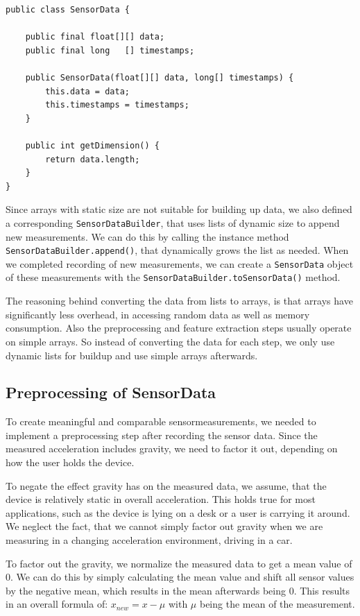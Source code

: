 \begin{lstlisting}[float,
caption={Class \lstinline$SensorData$ containing the raw sensor readings},
label={lst:sensordata}]
public class SensorData {
    
    public final float[][] data;
    public final long   [] timestamps;

    public SensorData(float[][] data, long[] timestamps) {
        this.data = data;
        this.timestamps = timestamps;
    }

    public int getDimension() {
        return data.length;
    }
}
\end{lstlisting}

Since arrays with static size are not suitable for building up data, we also defined a corresponding \lstinline$SensorDataBuilder$, that uses lists of dynamic size to append new measurements. We can do this by calling the instance method \lstinline$SensorDataBuilder.append()$, that dynamically grows the list as needed. When we completed recording of new measurements, we can create a \lstinline$SensorData$ object of these measurements with the \lstinline$SensorDataBuilder.toSensorData()$ method.

The reasoning behind converting the data from lists to arrays, is that arrays have significantly less overhead, in accessing random data as well as memory consumption. Also the preprocessing and feature extraction steps usually operate on simple arrays. So instead of converting the data for each step, we only use dynamic lists for buildup and use simple arrays afterwards.

\subsection{Preprocessing of SensorData}
To create meaningful and comparable sensormeasurements, we needed to implement a preprocessing step after recording the sensor data. Since the measured acceleration includes gravity, we need to factor it out, depending on how the user holds the device.

To negate the effect gravity has on the measured data, we assume, that the device is relatively static in overall acceleration. This holds true for most applications, such as the device is lying on a desk or a user is carrying it around. We neglect the fact, that we cannot simply factor out gravity when we are measuring in a changing acceleration environment, \eg driving in a car.

To factor out the gravity, we normalize the measured data to get a mean value of 0. We can do this by simply calculating the mean value and shift all sensor values by the negative mean, which results in the mean afterwards being 0. This results in an overall formula of: $ x_{new} = x - \mu $ with $\mu$ being the mean of the measurement.

